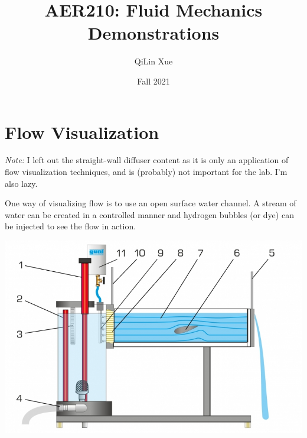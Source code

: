 \documentclass{article}
\title{AER210: Fluid Mechanics Demonstrations}
\author{QiLin Xue}
\date{Fall 2021}
\begin{document}
\maketitle
\section{Flow Visualization}
\textit{Note:} I left out the straight-wall diffuser content as it is only an application of flow visualization techniques, and is (probably) not important for the lab. I'm also lazy.

One way of visualizing flow is to use an open surface water channel. A stream of water can be created in a controlled manner and hydrogen bubbles (or dye) can be injected to see the flow in action.
\begin{center}
    \includegraphics[width=0.4\linewidth]{visual.jpg}
\end{center}
\end{document}
